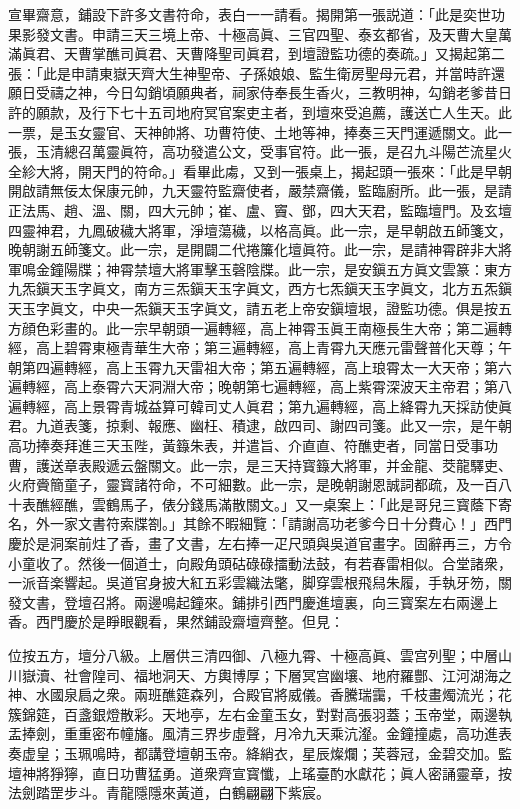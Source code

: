 宣畢齋意，鋪設下許多文書符命，表白一一請看。揭開第一張説道：「此是奕世功果影發文書。申請三天三境上帝、十極高眞、三官四聖、泰玄都省，及天曹大皇萬滿眞君、天曹掌醮司眞君、天曹降聖司眞君，到壇證監功德的奏疏。」又揭起第二張：「此是申請東嶽天齊大生神聖帝、子孫娘娘、監生衛房聖母元君，并當時許還願日受禱之神，今日勾銷頃願典者，祠家侍奉長生香火，三教明神，勾銷老爹昔日許的願款，及行下七十五司地府冥官案吏主者，到壇來受追薦，護送亡人生天。此一票，是玉女靈官、天神帥將、功曹符使、土地等神，捧奏三天門運遞關文。此一張，玉清總召萬靈眞符，高功發遣公文，受事官符。此一張，是召九斗陽芒流星火全紾大將，開天門的符命。」看畢此䖏，又到一張桌上，揭起頭一張來：「此是早朝開啟請無佞太保康元帥，九天靈符監齋使者，嚴禁齋儀，監臨廚所。此一張，是請正法馬、趙、溫、關，四大元帥；崔、盧、竇、鄧，四大天君，監臨壇門。及玄壇四靈神君，九鳳破穢大將軍，淨壇蕩穢，以格高眞。此一宗，是早朝啟五師箋文，晚朝謝五師箋文。此一宗，是開闢二代捲簾化壇眞符。此一宗，是請神霄辟非大將軍鳴金鐘陽牒；神霄禁壇大將軍擊玉磬陰牒。此一宗，是安鎭五方眞文雲篆：東方九炁鎭天玉字眞文，南方三炁鎭天玉字眞文，西方七炁鎭天玉字眞文，北方五炁鎭天玉字眞文，中央一炁鎭天玉字眞文，請五老上帝安鎭壇垠，證監功德。俱是按五方顔色彩畫的。此一宗早朝頭一遍轉經，高上神霄玉眞王南極長生大帝；第二遍轉經，高上碧霄東極青華生大帝；第三遍轉經，高上青霄九天應元雷聲普化天尊；午朝第四遍轉經，高上玉霄九天雷祖大帝；第五遍轉經，高上琅霄太一大天帝；第六遍轉經，高上泰霄六天洞淵大帝；晚朝第七遍轉經，高上紫霄深波天主帝君；第八遍轉經，高上景霄青城益算可韓司丈人眞君；第九遍轉經，高上絳霄九天採訪使眞君。九道表箋，掠剩、報應、幽枉、積逮，啟四司、謝四司箋。此又一宗，是午朝高功捧奏拜進三天玉陛，黃籙朱表，并遣旨、介直直、符醮吏者，同當日受事功曹，護送章表殿遞云盤關文。此一宗，是三天持寳籙大將軍，并金龍、茭龍驛吏、火府賫簡童子，靈寳諸符命，不可細數。此一宗，是晚朝謝恩誠詞都疏，及一百八十表醮經醮，雲鶴馬子，俵分錢馬滿散關文。」又一桌案上：「此是哥兒三寳蔭下寄名，外一家文書符索牒劄。」其餘不暇細覽：「請謝高功老爹今日十分費心！」西門慶於是洞案前炷了香，畫了文書，左右捧一疋尺頭與吳道官畫字。固辭再三，方令小童收了。然後一個道士，向殿角頭𥑮碌碌擂動法鼓，有若春雷相似。合堂諸衆，一派音楽響起。吳道官身披大紅五彩雲織法氅，脚穿雲根飛舄朱履，手執牙笏，關發文書，登壇召將。兩邊鳴起鐘來。鋪排引西門慶進壇裏，向三寳案左右兩邊上香。西門慶於是睜眼觀看，果然鋪設齋壇齊整。但見：

\begin{myquote}
位按五方，壇分八級。上層供三清四御、八極九霄、十極高眞、雲宫列聖；中層山川嶽瀆、社會隍司、福地洞天、方輿博厚；下層冥宫幽壤、地府羅酆、江河湖海之神、水國泉扃之衆。兩班醮筵森列，合殿官將威儀。香騰瑞靄，千枝畫燭流光；花簇錦筵，百盞銀燈散彩。天地亭，左右金童玉女，對對高張羽蓋；玉帝堂，兩邊執盂捧劍，重重密布幢旛。風清三界步虛聲，月冷九天乘沆瀣。金鐘撞處，高功進表奏虚皇；玉珮鳴時，都講登壇朝玉帝。絳綃衣，星辰燦爛；芙蓉冠，金碧交加。監壇神將猙獰，直日功曹猛勇。道衆齊宣寳懺，上瑤臺酌水獻花；眞人密誦靈章，按法劍踏罡步斗。青龍隱隱來黃道，白鶴翩翩下紫宸。
\end{myquote}

